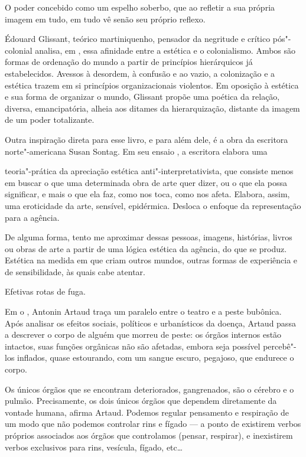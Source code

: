 \begin{multicols}{2}
O poder concebido como um espelho soberbo, que ao refletir a sua própria
imagem em tudo, em tudo vê senão seu próprio reflexo.

Édouard Glissant, teórico martiniquenho, pensador da negritude e crítico
pós"-colonial analisa, em {}, essa afinidade
entre a estética e o colonialismo. Ambos são formas de ordenação do
mundo a partir de princípios hierárquicos já estabelecidos. Avessos à
desordem, à confusão e ao vazio, a colonização e a estética trazem em si
princípios organizacionais violentos. Em oposição à estética e sua forma
de organizar o mundo, Glissant propõe uma poética da relação, diversa,
emancipatória, alheia aos ditames da hierarquização, distante da imagem
de um poder totalizante.

Outra inspiração direta para esse livro, e para além dele, é a obra da
escritora norte"-americana Susan Sontag. Em seu ensaio {}, a escritora elabora uma \begin{figure}\end{figure}teoria"-prática da apreciação estética
anti"-interpretativista, que consiste menos em buscar o que uma
determinada obra de arte quer dizer, ou o que ela possa significar, e
mais o que ela faz, como nos toca, como nos afeta. Elabora, assim, uma
eroticidade da arte, sensível, epidérmica. Desloca o enfoque da
representação para a agência.

De alguma forma, tento me aproximar dessas pessoas, imagens, histórias,
livros ou obras de arte a partir de uma lógica estética da agência, do
que se produz. Estética na medida em que criam outros mundos, outras
formas de experiência e de sensibilidade, às quais cabe atentar.

Efetivas rotas de fuga.

{}

Em o {}, Antonin Artaud traça um paralelo entre o
teatro e a peste bubônica. Após analisar os efeitos sociais, políticos e
urbanísticos da doença, Artaud passa a descrever o corpo de alguém que
morreu de peste: os órgãos internos estão intactos, suas funções
orgânicas não são afetadas, embora seja possível percebê"-los inflados,
quase estourando, com um sangue escuro, pegajoso, que endurece o corpo.

Os únicos órgãos que se encontram deteriorados, gangrenados, são o
cérebro e o pulmão. Precisamente, os dois únicos órgãos que dependem
diretamente da vontade humana, afirma Artaud. Podemos regular
pensamento e respiração de um modo que não podemos controlar rins e
fígado --- a ponto de existirem verbos próprios associados aos órgãos que
controlamos (pensar, respirar), e inexistirem verbos exclusivos para
rins, vesícula, fígado, etc\ldots{}


\end{multicols}
